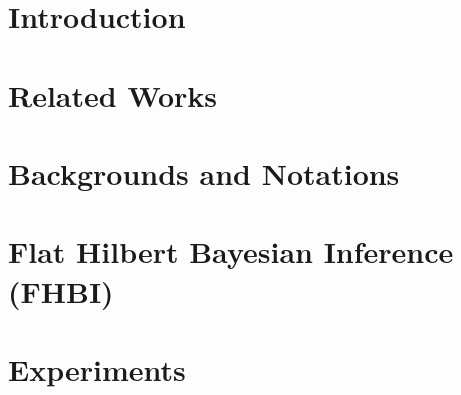\documentclass{article}
\theoremstyle{plain}
\theoremstyle{definition}
\theoremstyle{remark}
\begin{document}
\printAffiliationsAndNotice{\icmlEqualContribution} %

\begin{abstract}
We introduce Flat Hilbert Bayesian Inference (FHBI), an algorithm designed to enhance generalization in Bayesian inference. Our approach involves an iterative two-step procedure with an adversarial functional perturbation step and a functional descent step within a reproducing kernel Hilbert space. This methodology is supported by a theoretical analysis that extends previous findings on generalization ability from finite-dimensional Euclidean spaces to infinite-dimensional functional spaces. To evaluate the effectiveness of FHBI, we conduct comprehensive comparisons against nine baseline methods on the \texttt{VTAB-1K} benchmark, which encompasses 19 diverse datasets across various domains with diverse semantics. Empirical results demonstrate that FHBI consistently outperforms the baselines by notable margins, highlighting its practical efficacy. 

\end{abstract}

\section{Introduction}
\label{section: introduction}


\section{Related Works}
\label{section: related works}


\section{Backgrounds and Notations}
\label{section: preliminaries}


\section{Flat Hilbert Bayesian Inference (FHBI)}
\label{section: methodology}


\section{Experiments}
\label{section: experiments}

\end{document}
